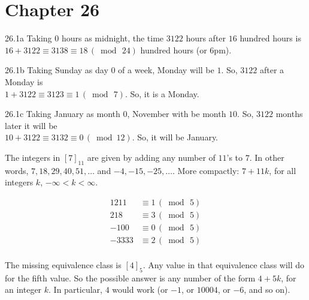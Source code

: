    \section*{Chapter 26}
      
\begin{Solution}{26.1a}
Taking $0$ hours as midnight, the time $3122$ hours after $16$ hundred hours is\\
 $16+3122 \equiv 3138\equiv 18 \,(\bmod\,24)$ hundred hours (or $6$pm).

\end{Solution}

\begin{Solution}{26.1b}
Taking Sunday as day $0$ of a week, Monday will be $1$. So, $3122$ after a Monday is\\
$1 + 3122 \equiv 3123 \equiv 1 \,(\bmod\,7)$. So, it is a Monday.

\end{Solution}

\begin{Solution}{26.1c}
Taking January as month $0$, November with be month $10$. So, $3122$ months later it will be\\
$10+3122 \equiv 3132 \equiv 0 \, (\bmod 12)$. So, it will be January.

\end{Solution}

\begin{Solution}{26.2}
The integers in $[7]_{11}$ are given by adding any number of $11$'s to $7$. In other words,
$7, 18, 29, 40, 51, \ldots$ and $-4, -15, -25, \ldots$. More compactly: $7+11k$, for all integers $k$, 
 $-\infty<k<\infty$.

\end{Solution}

\begin{Solution}{26.3}
\begin{align*}
1211 &\equiv 1\,(\bmod\,5)\\
218 &\equiv 3 \,(\bmod\,5)\\
-100 &\equiv 0 \,(\bmod\,5)\\
-3333 &\equiv 2 \,(\bmod\,5)\\
\end{align*}

The missing equivalence class is $[4]_5$. Any value in that equivalence class will do for the fifth value.
So the possible answer is any number of the form $4 + 5k$, for an integer $k$. In particular, $4$ would work (or $-1$, or $10004$, or $-6$, and so on).

\end{Solution}

